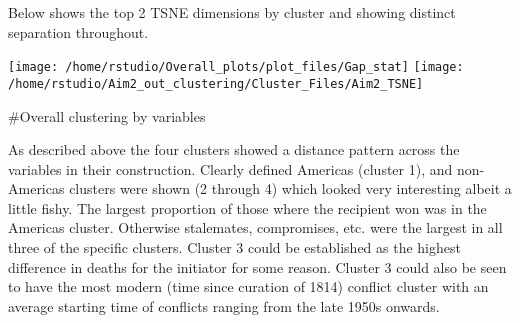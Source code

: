 \documentclass[
]{article}
\begin{document}
Below shows the top 2 TSNE dimensions by cluster and showing distinct
separation throughout.

\texttt{[image: /home/rstudio/Overall\_plots/plot\_files/Gap\_stat]}
\texttt{[image: /home/rstudio/Aim2\_out\_clustering/Cluster\_Files/Aim2\_TSNE]}

\#Overall clustering by variables

As described above the four clusters showed a distance pattern across
the variables in their construction. Clearly defined Americas (cluster
1), and non-Americas clusters were shown (2 through 4) which looked very
interesting albeit a little fishy. The largest proportion of those where
the recipient won was in the Americas cluster. Otherwise stalemates,
compromises, etc. were the largest in all three of the specific
clusters. Cluster 3 could be established as the highest difference in
deaths for the initiator for some reason. Cluster 3 could also be seen
to have the most modern (time since curation of 1814) conflict cluster
with an average starting time of conflicts ranging from the late 1950s
onwards.
\end{document}
